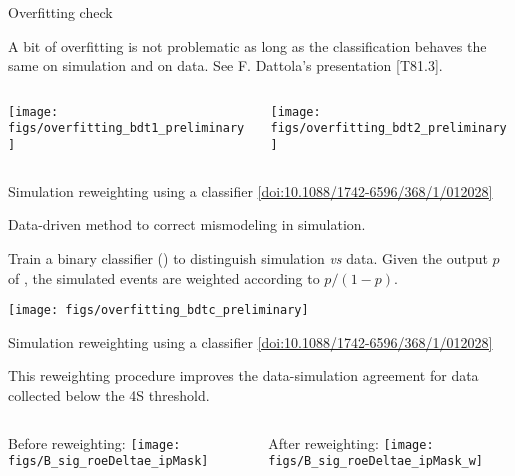 \begin{frame}{Overfitting check}
\bi
\item A bit of overfitting is not problematic as long as the classification behaves the same on simulation and on data.
\bi
\itemiii See F. Dattola's presentation [T81.3].
\ei
\ei
\vspace{0.5cm}
\begin{columns}
\begin{column}{0.5\linewidth}
\texttt{[image: figs/overfitting\_bdt1\_preliminary]}
\end{column}
\begin{column}{0.5\linewidth}
\texttt{[image: figs/overfitting\_bdt2\_preliminary]}
\end{column}
\end{columns}
\end{frame}
\begin{frame}{Simulation reweighting using a classifier \hfill {\tiny 
\href{https://iopscience.iop.org/article/10.1088/1742-6596/368/1/012028}{\color{blue!40!gray}[doi:10.1088/1742-6596/368/1/012028]}
}}
\bi
\item Data-driven method to correct mismodeling in simulation.
\begin{enumerate}
	\itemii Train a binary classifier (\bdtoff) to distinguish {\color{blue}simulation} \textit{vs} {\color{red}data}.
\itemii Given the output $p$ of \bdtoff, the simulated events are weighted according to $p/(1-p)$.
\end{enumerate}
\ei
\vspace{0.5cm}
\centering
\texttt{[image: figs/overfitting\_bdtc\_preliminary]}
\end{frame}
\begin{frame}{Simulation reweighting using a classifier \hfill {\tiny 
\href{https://iopscience.iop.org/article/10.1088/1742-6596/368/1/012028}{\color{blue!40!gray}[doi:10.1088/1742-6596/368/1/012028]}
}}
\bi
\item This reweighting procedure improves the data-simulation agreement for data collected below the \Y4S threshold.
\ei
\vspace{0.5cm}
\begin{columns}
\begin{column}{0.5\linewidth}
{\small Before reweighting:}
\texttt{[image: figs/B\_sig\_roeDeltae\_ipMask]}
\end{column}
\begin{column}{0.5\linewidth}
{\small After reweighting:}
\texttt{[image: figs/B\_sig\_roeDeltae\_ipMask\_w]}
\end{column}
\end{columns}
\end{frame}
